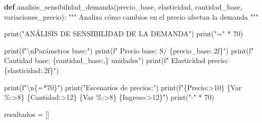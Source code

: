 \documentclass[
  doc,
  floatsintext,
  longtable,
  a4paper,
  nolmodern,
  notxfonts,
  notimes,
  12pt,
  colorlinks=true,linkcolor=blue,citecolor=blue,urlcolor=blue]{apa7}
\newenvironment{Shaded}{\begin{snugshade}}{\end{snugshade}}
\newcommand{\BuiltInTok}[1]{\textcolor[rgb]{0.00,0.23,0.31}{#1}}
\newcommand{\CharTok}[1]{\textcolor[rgb]{0.13,0.47,0.30}{#1}}
\newcommand{\CommentTok}[1]{\textcolor[rgb]{0.37,0.37,0.37}{#1}}
\newcommand{\DecValTok}[1]{\textcolor[rgb]{0.68,0.00,0.00}{#1}}
\newcommand{\KeywordTok}[1]{\textcolor[rgb]{0.00,0.23,0.31}{\textbf{#1}}}
\newcommand{\NormalTok}[1]{\textcolor[rgb]{0.00,0.23,0.31}{#1}}
\newcommand{\OperatorTok}[1]{\textcolor[rgb]{0.37,0.37,0.37}{#1}}
\newcommand{\SpecialCharTok}[1]{\textcolor[rgb]{0.37,0.37,0.37}{#1}}
\newcommand{\SpecialStringTok}[1]{\textcolor[rgb]{0.13,0.47,0.30}{#1}}
\newcommand{\StringTok}[1]{\textcolor[rgb]{0.13,0.47,0.30}{#1}}
\begin{document}
\begin{Shaded}
\begin{Highlighting}[]
\KeywordTok{def}\NormalTok{ analisis\_sensibilidad\_demanda(precio\_base, elasticidad, cantidad\_base, }
\NormalTok{                                   variaciones\_precio):}
    \CommentTok{"""}
\CommentTok{    Analiza cómo cambios en el precio afectan la demanda}
\CommentTok{    """}
    
    \BuiltInTok{print}\NormalTok{(}\StringTok{"ANÁLISIS DE SENSIBILIDAD DE LA DEMANDA"}\NormalTok{)}
    \BuiltInTok{print}\NormalTok{(}\StringTok{"="} \OperatorTok{*} \DecValTok{70}\NormalTok{)}
    
    \BuiltInTok{print}\NormalTok{(}\SpecialStringTok{f"}\CharTok{\textbackslash{}n}\SpecialStringTok{Parámetros base:"}\NormalTok{)}
    \BuiltInTok{print}\NormalTok{(}\SpecialStringTok{f"  Precio base: S/ }\SpecialCharTok{\{}\NormalTok{precio\_base}\SpecialCharTok{:.2f\}}\SpecialStringTok{"}\NormalTok{)}
    \BuiltInTok{print}\NormalTok{(}\SpecialStringTok{f"  Cantidad base: }\SpecialCharTok{\{}\NormalTok{cantidad\_base}\SpecialCharTok{:,\}}\SpecialStringTok{ unidades"}\NormalTok{)}
    \BuiltInTok{print}\NormalTok{(}\SpecialStringTok{f"  Elasticidad precio: }\SpecialCharTok{\{}\NormalTok{elasticidad}\SpecialCharTok{:.2f\}}\SpecialStringTok{"}\NormalTok{)}
    
    \BuiltInTok{print}\NormalTok{(}\SpecialStringTok{f"}\CharTok{\textbackslash{}n}\SpecialCharTok{\{}\StringTok{\textquotesingle{}=\textquotesingle{}}\OperatorTok{*}\DecValTok{70}\SpecialCharTok{\}}\SpecialStringTok{"}\NormalTok{)}
    \BuiltInTok{print}\NormalTok{(}\StringTok{"Escenarios de precios:"}\NormalTok{)}
    \BuiltInTok{print}\NormalTok{(}\SpecialStringTok{f"}\SpecialCharTok{\{}\StringTok{\textquotesingle{}Precio\textquotesingle{}}\SpecialCharTok{:\textgreater{}10\}}\SpecialStringTok{ }\SpecialCharTok{\{}\StringTok{\textquotesingle{}Var \%\textquotesingle{}}\SpecialCharTok{:\textgreater{}8\}}\SpecialStringTok{ }\SpecialCharTok{\{}\StringTok{\textquotesingle{}Cantidad\textquotesingle{}}\SpecialCharTok{:\textgreater{}12\}}\SpecialStringTok{ }\SpecialCharTok{\{}\StringTok{\textquotesingle{}Var \%\textquotesingle{}}\SpecialCharTok{:\textgreater{}8\}}\SpecialStringTok{ }\SpecialCharTok{\{}\StringTok{\textquotesingle{}Ingreso\textquotesingle{}}\SpecialCharTok{:\textgreater{}12\}}\SpecialStringTok{"}\NormalTok{)}
    \BuiltInTok{print}\NormalTok{(}\StringTok{"{-}"} \OperatorTok{*} \DecValTok{70}\NormalTok{)}
    
\NormalTok{    resultados }\OperatorTok{=}\NormalTok{ []}
    

\end{Highlighting}
\end{Shaded}
\end{document}
